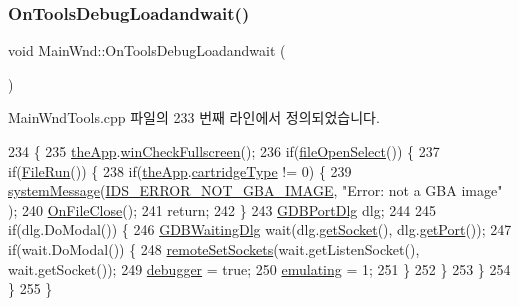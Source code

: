 \subsubsection{\texorpdfstring{On\+Tools\+Debug\+Loadandwait()}{OnToolsDebugLoadandwait()}}
{\footnotesize\ttfamily void Main\+Wnd\+::\+On\+Tools\+Debug\+Loadandwait (\begin{DoxyParamCaption}{ }\end{DoxyParamCaption})\hspace{0.3cm}{\ttfamily [protected]}}



Main\+Wnd\+Tools.\+cpp 파일의 233 번째 라인에서 정의되었습니다.


\begin{DoxyCode}
234 \{
235   \mbox{\hyperlink{_v_b_a_8cpp_a8095a9d06b37a7efe3723f3218ad8fb3}{theApp}}.\mbox{\hyperlink{class_v_b_a_a340eaeeb7fcfc242f08ac3442d991a96}{winCheckFullscreen}}();
236   \textcolor{keywordflow}{if}(\mbox{\hyperlink{class_main_wnd_a872b497a88ca77012694cc909c62e6e4}{fileOpenSelect}}()) \{
237     \textcolor{keywordflow}{if}(\mbox{\hyperlink{class_main_wnd_a946cd4793215a424eb736af418ccbc3d}{FileRun}}()) \{
238       \textcolor{keywordflow}{if}(\mbox{\hyperlink{_v_b_a_8cpp_a8095a9d06b37a7efe3723f3218ad8fb3}{theApp}}.\mbox{\hyperlink{class_v_b_a_af300759fcbc7eeb00ce73f956fc5ddb7}{cartridgeType}} != 0) \{
239         \mbox{\hyperlink{system_8cpp_a747a9cb8e015a3d45cca636b5bd0fc69}{systemMessage}}(\mbox{\hyperlink{resource_8h_a89e818bbb278f5d37ed3a449a6d0cd86}{IDS\_ERROR\_NOT\_GBA\_IMAGE}}, \textcolor{stringliteral}{"Error: not a GBA image"}
      );
240         \mbox{\hyperlink{class_main_wnd_abf162c1763ea3246bdac171847fb2d9d}{OnFileClose}}();
241         \textcolor{keywordflow}{return};
242       \}
243       \mbox{\hyperlink{class_g_d_b_port_dlg}{GDBPortDlg}} dlg;
244 
245       \textcolor{keywordflow}{if}(dlg.DoModal()) \{
246         \mbox{\hyperlink{class_g_d_b_waiting_dlg}{GDBWaitingDlg}} wait(dlg.\mbox{\hyperlink{class_g_d_b_port_dlg_a6319081133e78827d9dfb6c287d88068}{getSocket}}(), dlg.\mbox{\hyperlink{class_g_d_b_port_dlg_aedb1de0b6ce4cf403b6be05f2a6d9668}{getPort}}());
247         \textcolor{keywordflow}{if}(wait.DoModal()) \{
248           \mbox{\hyperlink{_main_wnd_tools_8cpp_ad14c1ac8c61f0b3d4bf2921ebe6d497b}{remoteSetSockets}}(wait.getListenSocket(), wait.getSocket());
249           \mbox{\hyperlink{_main_wnd_tools_8cpp_af67e2df4c66ef114f4edb85c06810007}{debugger}} = \textcolor{keyword}{true};
250           \mbox{\hyperlink{_main_wnd_tools_8cpp_af9cc36078b1b311753963297ae7f2a74}{emulating}} = 1;
251         \}
252       \}
253     \}
254   \}
255 \}
\end{DoxyCode}
